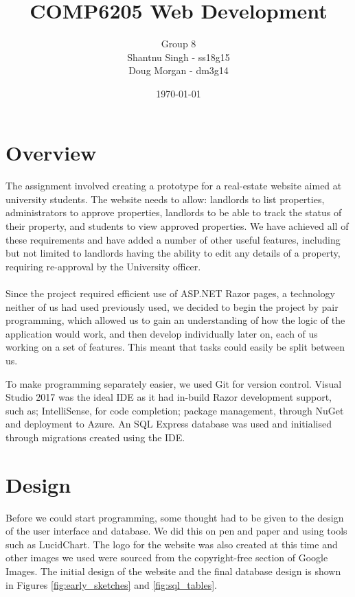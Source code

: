 \documentclass{article}
\begin{document}
\title{COMP6205 Web Development\\}
\author{Group 8\\Shantnu Singh - ss18g15\\Doug Morgan - dm3g14}
\date{\today}
\maketitle

\section{Overview}
    \paragraph{}
        The assignment involved creating a prototype for a real-estate website aimed at university students.
        The website needs to allow: landlords to list properties, administrators to approve properties, landlords to be able to track the status of their property, and students to view approved properties.
        We have achieved all of these requirements and have added a number of other useful features, including but not limited to landlords having the ability to edit any details of a property, requiring re-approval by the University officer.

    \paragraph{}
        Since the project required efficient use of ASP.NET Razor pages, a technology neither of us had used previously used, we decided to begin the project by pair programming, which allowed us to gain an understanding of how the logic of the application would work, and then develop individually later on, each of us working on a set of features.
        This meant that tasks could easily be split between us.

    \par
        To make programming separately easier, we used Git for version control.
        Visual Studio 2017 was the ideal IDE as it had in-build Razor development support, such as; IntelliSense, for code completion; package management, through NuGet and deployment to Azure.
        An SQL Express database was used and initialised through migrations created using the IDE.

\section{Design}
    \par
        Before we could start programming, some thought had to be given to the design of the user interface and database.
        We did this on pen and paper and using tools such as LucidChart.
        The logo for the website was also created at this time and other images we used were sourced from the copyright-free section of Google Images.
        The initial design of the website and the final database design is shown in Figures \ref{fig:early_sketches} and \ref{fig:sql_tables}.
\end{document}
